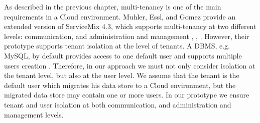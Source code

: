 As described in the previous chapter, multi-tenancy is one of the main requirements in a Cloud environment. Muhler, Essl, and Gomez provide an extended version of ServiceMix 4.3, which supports multi-tenancy at two different levels: communication, and administration and management \cite{Muhler2012}, \cite{Essl2011}, \cite{gomez2012}. However, their prototype supports tenant isolation at the level of tenants. A \ac{DBMS}, e.g. MySQL, by default provides access to one default user and supports multiple users creation \cite{mysqlmanual}. Therefore, in our approach we must not only consider isolation at the tenant level, but also at the user level. We assume that the tenant is the default user which migrates his data store to a Cloud environment, but the migrated data store may contain one or more users. In our prototype we ensure tenant and user isolation at both communication, and administration and management levels.

